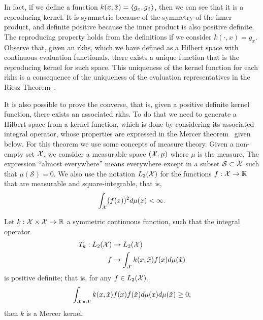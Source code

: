In fact, if we define a function $k(x, \tilde{x}) = \bm{\left\langle} g_x, g_{\tilde{x}} \bm{\right\rangle}$, then we can see that it is a reproducing kernel. It is symmetric because of the symmetry of the inner product, and definite positive because the inner product is also positive definite. The reproducing property 
holds from the definitions if we consider $k(\cdot, x) = g_x$.
%
Observe that, given an \acrshort{rkhs}, which we have defined as a Hilbert space with continuous evaluation functionals, there exists a unique function that is the reproducing kernel for such space. This uniqueness of the kernel function for each \acrshort{rkhs} is a consequence of the uniqueness of the evaluation representatives in the Riesz Theorem~\citep{riesz2012functional}.
%

It is also possible to prove the converse, that is, given a positive definite kernel function, there exists an associated \acrshort{rkhs}.
To do that we need to generate a Hilbert space from a kernel function, which is done by considering its associated integral operator, whose properties are expressed in the Mercer theorem~\citep{ScholkopfS02} given below. For this theorem we use some concepts of measure theory. 
%
Given a non-empty set $\mathcal{X}$, we consider a measurable space $(\mathcal{X}, \mu)$ where $\mu$ is the measure. The expression ``almost everywhere'' means everywhere except in a subset $\mathcal{S} \subset \mathcal{X}$ such that $\mu(\mathcal{S}) = 0$. We also use the notation $L_2(\mathcal{X})$ for the functions $f: \mathcal{X} \to \mathbb{R}$ that are measurable and square-integrable, that is,
$$ \int_{\mathcal{X}} (f(x))^2 d\mu(x) < \infty .$$

\begin{definition}
    Let $k: \mathcal{X} \times \mathcal{X} \to \mathbb{R}$ a symmetric continuous function, such that the integral operator 
    \begin{equation}
        \begin{aligned}
    \nonumber
    T_k: L_2(\mathcal{X}) &\to L_2(\mathcal{X}) \\
    f &\to \int_{\mathcal{X}} k(x, \tilde{x}) f(x) d \mu(\tilde{x}) 
\end{aligned}
\end{equation}    
is positive definite; that is, for any $f \in L_2(\mathcal{X})$, 
\begin{equation}
    \nonumber
    \int_{\mathcal{X} \times \mathcal{X}} k(x, \tilde{x}) f(x) f(\tilde{x}) d\mu(x) d\mu(\tilde{x}) \geq 0 ;
\end{equation}
then $k$ is a Mercer kernel.
\end{definition}

